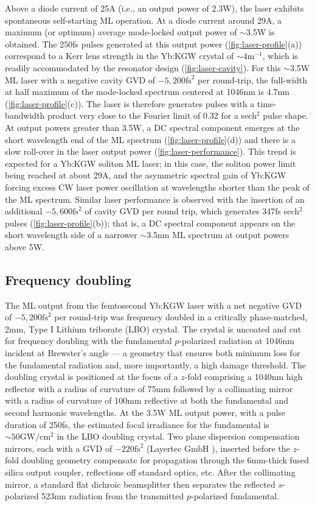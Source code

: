 Above a diode current of 25A (i.e., an output power of 2.3W), the laser exhibits spontaneous self-starting ML operation.
At a diode current around 29A, a maximum (or optimum) average mode-locked output power of $\sim$3.5W is obtained.
The 250fs pulses generated at this output power (\ref{fig:laser-profile}(a)) correspond to a Kerr lens strength in the Yb:KGW crystal of $\sim4 \text{m}^{-1}$, which is readily accommodated by the resonator design (\ref{fig:laser-cavity}).
For this $\sim$3.5W ML laser with a negative cavity GVD of $-5,200\text{fs}^2$ per round-trip, the full-width at
half maximum of the mode-locked spectrum centered at 1046nm is 4.7nm (\ref{fig:laser-profile}(c)).
The laser is therefore generates pulses with a time-bandwidth product very close to the Fourier limit of 0.32 for a sech$^2$ pulse shape.
At output powers greater than 3.5W, a DC spectral component emerges at the short wavelength end of the ML spectrum (\ref{fig:laser-profile}(d)) and there is a slow roll-over in the laser output power (\ref{fig:laser-performance}).
This trend is expected for a Yb:KGW soliton ML laser; in this case, the soliton power limit being reached at about 29A, and the asymmetric spectral gain of Yb:KGW forcing excess CW laser power oscillation at wavelengths shorter than the peak of the ML spectrum.
Similar laser performance is observed with the insertion of an additional $-5,600\text{fs}^2$ of cavity GVD per round trip, which generates 347fs sech$^2$ pulses (\ref{fig:laser-profile}(b)); that is, a DC spectral component appears on the short wavelength side of a narrower $\sim$3.5nm ML spectrum at output powers above 5W.

\subsection{Frequency doubling}

The ML output from the femtosecond Yb:KGW laser with a net negative GVD of $-5,200\text{fs}^2$ per round-trip was frequency doubled in a critically phase-matched, 2mm, Type I Lithium triborate (LBO) crystal.
The crystal is uncoated and cut for frequency doubling with the fundamental $p$-polarized radiation at 1046nm incident at Brewster's angle --- a geometry that ensures both minimum loss for the fundamental radiation and, more importantly, a high damage threshold.
The doubling crystal is positioned at the focus of a $z$-fold comprising a 1040nm high reflector with a radius of curvature of 75mm followed by a collimating mirror with a radius of curvature of 100mm reflective at both the fundamental and second harmonic wavelengths.
At the 3.5W ML output power, with a pulse duration of 250fs, the estimated focal irradiance for the fundamental is $\sim50\text{GW}/\text{cm}^2$ in the LBO doubling crystal.
Two plane dispersion compensation mirrors, each with a GVD of $-220\text{fs}^2$ (Layertec GmbH \cite{website_layertec}), inserted before the $z$-fold doubling geometry compensate for propagation through the 6mm-thick fused silica output coupler, reflections off standard optics, etc.
After the collimating
mirror, a standard flat dichroic beamsplitter then separates the reflected $s$-polarized 523nm radiation from the transmitted $p$-polarized fundamental.

